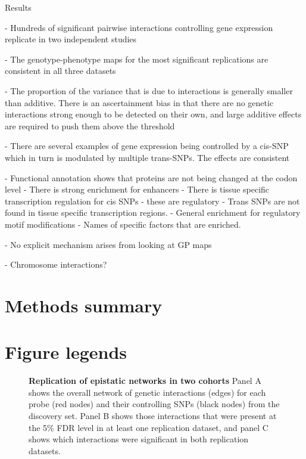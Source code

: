 \documentclass{article}
\begin{document}
Results


- Hundreds of significant pairwise interactions controlling gene expression replicate in two independent studies



- The genotype-phenotype maps for the most significant replications are consistent in all three datasets



- The proportion of the variance that is due to interactions is generally smaller than additive. There is an ascertainment bias in that there are no genetic interactions strong enough to be detected on their own, and large additive effects are required to push them above the threshold



- There are several examples of gene expression being controlled by a cis-SNP which in turn is modulated by multiple trans-SNPs. The effects are consistent 



- Functional annotation shows that proteins are not being changed at the codon level
- There is strong enrichment for enhancers
- There is tissue specific transcription regulation for cis SNPs - these are regulatory
- Trans SNPs are not found in tissue specific transcription regions.
- General enrichment for regulatory motif modifications
- Names of specific factors that are enriched.



- No explicit mechanism arises from looking at GP maps



- Chromosome interactions?



\clearpage
\section{Methods summary}




\clearpage
\section{Figure legends}

\begin{figure}
	\caption{\textbf{Replication of epistatic networks in two cohorts} Panel A shows the overall network of genetic interactions (edges) for each probe (red nodes) and their controlling SNPs (black nodes) from the discovery set. Panel B shows those interactions that were present at the 5\% FDR level in at least one replication dataset, and panel C shows which interactions were significant in both replication datasets.}
	\label{fig:fireworks}
\end{figure}
\end{document}
